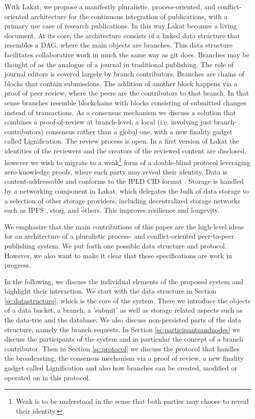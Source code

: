 With Lakat, we propose a manifestly pluralistic, process-oriented, and conflict-oriented architecture for the continuous integration of publications, with a primary use case of research publications. In this way Lakat becomes a living document. At its core, the architecture consists of a linked data structure that resembles a DAG, where the main objects are branches. This data structure facilitates collaborative work in much the same way as git does. Branches may be thought of as the analogue of a journal in traditional publishing. The role of journal editors is covered largely by branch contributors. Branches are chains of blocks that contain submissions. The addition of another block happens via a proof of peer review, where the peers are the contributors to that branch. In that sense branches resemble blockchains with blocks consisting of submitted changes instead of transactions. As a consensus mechanism we discuss a solution that combines a proof-of-review at branch-level, a local (i.e. involving just branch-contributors) consensus rather than a global one, with a new finality gadget called Lignification. The review process is open. In a first version of Lakat the identities of the reviewers and the creators of the reviewed content are disclosed, however we wish to migrate to a weak\footnote{Weak is to be understood in the sense that both parties may choose to reveal their identity.} form of a double-blind protocol leveraging zero-knowledge proofs, where each party may reveal their identity.
Data is content-addressable and conforms to the IPLD CID format \cite{ipld2022}. Storage is handled by a networking component in Lakat, which delegates the bulk of data storage to a selection of other storage providers, including decentralized storage networks such as IPFS \cite{psaras2020interplanetary, guidi2021data, trautwein2022design}, storj, and others. This improves resilience and longevity. 

We emphasize that the main contributions of this paper are the high-level ideas for an architecture of a pluralistic process- and conflict-oriented peer-to-peer publishing system. We put forth one possible data structure and protocol. However, we also want to make it clear that these specifications are work in progress.  

In the following, we discuss the individual elements of the proposed system and highlight their interaction. We start with the data structure in Section \ref{sc:datastructure}, which is the core of the system. There we introduce the objects of a data bucket, a branch, a 'submit' as well as storage related aspects such as the data-trie and the database. We also discuss non-persisted parts of the data structure, namely the branch requests. In Section \ref{sc:participantsandnodes} we discuss the participants of the system and in particular the concept of a branch contributor. Then in Section \ref{sc:protocol} we discuss the protocol that handles the broadcasting, the consensus mechanism via a proof of review, a new finality gadget called Lignification and also how branches can be created, modified or operated on in this protocol. 


